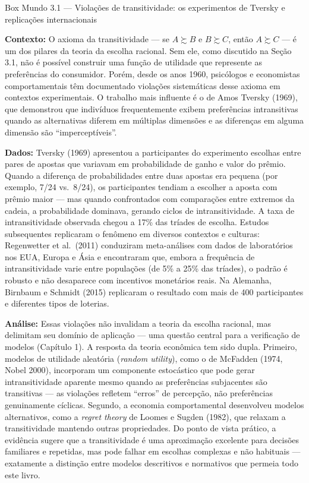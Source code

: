 \documentclass[11pt,twoside,openright]{book}
\begin{document}
\begin{boxmundobox}{Box Mundo 3.1 — Violações de transitividade: os experimentos de Tversky e replicações internacionais}

\textbf{Contexto:} O axioma da transitividade --- se \(A \succsim B\) e
\(B \succsim C\), então \(A \succsim C\) --- é um dos pilares da teoria
da escolha racional. Sem ele, como discutido na Seção 3.1, não é
possível construir uma função de utilidade que represente as
preferências do consumidor. Porém, desde os anos 1960, psicólogos e
economistas comportamentais têm documentado violações sistemáticas desse
axioma em contextos experimentais. O trabalho mais influente é o de Amos
Tversky (1969), que demonstrou que indivíduos frequentemente exibem
preferências intransitivas quando as alternativas diferem em múltiplas
dimensões e as diferenças em alguma dimensão são ``imperceptíveis''.

\textbf{Dados:} Tversky (1969) apresentou a participantes do experimento
escolhas entre pares de apostas que variavam em probabilidade de ganho e
valor do prêmio. Quando a diferença de probabilidades entre duas apostas
era pequena (por exemplo, 7/24 vs.~8/24), os participantes tendiam a
escolher a aposta com prêmio maior --- mas quando confrontados com
comparações entre extremos da cadeia, a probabilidade dominava, gerando
ciclos de intransitividade. A taxa de intransitividade observada chegou
a 17\% das tríades de escolha. Estudos subsequentes replicaram o
fenômeno em diversos contextos e culturas: Regenwetter et al.~(2011)
conduziram meta-análises com dados de laboratórios nos EUA, Europa e
Ásia e encontraram que, embora a frequência de intransitividade varie
entre populações (de 5\% a 25\% das tríades), o padrão é robusto e não
desaparece com incentivos monetários reais. Na Alemanha, Birnbaum e
Schmidt (2015) replicaram o resultado com mais de 400 participantes e
diferentes tipos de loterias.

\textbf{Análise:} Essas violações não invalidam a teoria da escolha
racional, mas delimitam seu domínio de aplicação --- uma questão central
para a verificação de modelos (Capítulo 1). A resposta da teoria
econômica tem sido dupla. Primeiro, modelos de utilidade aleatória
(\emph{random utility}), como o de McFadden (1974, Nobel 2000),
incorporam um componente estocástico que pode gerar intransitividade
aparente mesmo quando as preferências subjacentes são transitivas --- as
violações refletem ``erros'' de percepção, não preferências genuinamente
cíclicas. Segundo, a economia comportamental desenvolveu modelos
alternativos, como a \emph{regret theory} de Loomes e Sugden (1982), que
relaxam a transitividade mantendo outras propriedades. Do ponto de vista
prático, a evidência sugere que a transitividade é uma aproximação
excelente para decisões familiares e repetidas, mas pode falhar em
escolhas complexas e não habituais --- exatamente a distinção entre
modelos descritivos e normativos que permeia todo este livro.


\end{boxmundobox}
\end{document}
